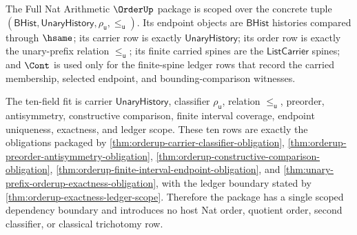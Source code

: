 \begin{theorem}
\label{thm:unary-prefix-orderup-scoped-dependency-package}
The Full Nat Arithmetic $\OrderUp$ package is scoped over the concrete tuple
$(\mathsf{BHist},\mathsf{UnaryHistory},\rho_{\mathsf{u}},\le_{\mathsf{u}})$.
Its endpoint objects are $\mathsf{BHist}$ histories compared through $\hsame$;
its carrier row is exactly $\mathsf{UnaryHistory}$; its order row is exactly
the unary-prefix relation $\le_{\mathsf{u}}$; its finite carried spines are
the $\mathsf{ListCarrier}$ spines; and $\Cont$ is used only for the
finite-spine ledger rows that record the carried membership, selected endpoint,
and bounding-comparison witnesses.

The ten-field fit is carrier $\mathsf{UnaryHistory}$, classifier
$\rho_{\mathsf{u}}$, relation $\le_{\mathsf{u}}$, preorder, antisymmetry,
constructive comparison, finite interval coverage, endpoint uniqueness,
exactness, and ledger scope. These ten rows are exactly the obligations
packaged by
\autoref{thm:orderup-carrier-classifier-obligation},
\autoref{thm:orderup-preorder-antisymmetry-obligation},
\autoref{thm:orderup-constructive-comparison-obligation},
\autoref{thm:orderup-finite-interval-endpoint-obligation}, and
\autoref{thm:unary-prefix-orderup-exactness-obligation}, with the ledger
boundary stated by \autoref{thm:orderup-exactness-ledger-scope}. Therefore the
package has a single scoped dependency boundary and introduces no host Nat
order, quotient order, second classifier, or classical trichotomy row.
\end{theorem}
